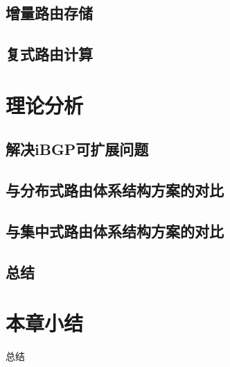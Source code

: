 \subsection{增量路由存储}
\subsection{复式路由计算}
\section{理论分析}
\subsection{解决iBGP可扩展问题}
\subsection{与分布式路由体系结构方案的对比}
\subsection{与集中式路由体系结构方案的对比}
\subsection{总结}

\section{本章小结}
总结